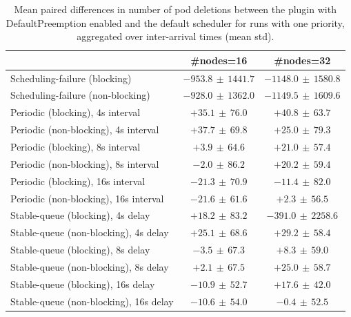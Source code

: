 \begin{table}[t]
\tiny
\setlength{\tabcolsep}{1.2pt}
\renewcommand{\arraystretch}{1.12}
\centering
\caption{Mean paired differences in number of pod deletions between the plugin with DefaultPreemption enabled and the default scheduler for runs with one priority, aggregated over inter-arrival times (mean \pm std).}
\label{tab:deletions-defpreempt1-prio1-std1-agg-arrival}
\begin{tabular}{l c c}
\toprule
 & \#nodes=16 & \#nodes=32 \\
\midrule
Scheduling-failure (blocking) & $-953.8\,\pm\,1441.7$ & $-1148.0\,\pm\,1580.8$ \\
Scheduling-failure (non-blocking) & $-928.0\,\pm\,1362.0$ & $-1149.5\,\pm\,1609.6$ \\
Periodic (blocking), 4s interval & $+35.1\,\pm\,76.0$ & $+40.8\,\pm\,63.7$ \\
Periodic (non-blocking), 4s interval & $+37.7\,\pm\,69.8$ & $+25.0\,\pm\,79.3$ \\
Periodic (blocking), 8s interval & $+3.9\,\pm\,64.6$ & $+21.0\,\pm\,57.4$ \\
Periodic (non-blocking), 8s interval & $-2.0\,\pm\,86.2$ & $+20.2\,\pm\,59.4$ \\
Periodic (blocking), 16s interval & $-21.3\,\pm\,70.9$ & $-11.4\,\pm\,82.0$ \\
Periodic (non-blocking), 16s interval & $-21.6\,\pm\,61.6$ & $+2.3\,\pm\,56.5$ \\
Stable-queue (blocking), 4s delay & $+18.2\,\pm\,83.2$ & $-391.0\,\pm\,2258.6$ \\
Stable-queue (non-blocking), 4s delay & $+25.1\,\pm\,68.6$ & $+29.2\,\pm\,58.4$ \\
Stable-queue (blocking), 8s delay & $-3.5\,\pm\,67.3$ & $+8.3\,\pm\,59.0$ \\
Stable-queue (non-blocking), 8s delay & $+2.1\,\pm\,67.5$ & $+25.0\,\pm\,58.7$ \\
Stable-queue (blocking), 16s delay & $-10.9\,\pm\,52.7$ & $+17.6\,\pm\,42.0$ \\
Stable-queue (non-blocking), 16s delay & $-10.6\,\pm\,54.0$ & $-0.4\,\pm\,52.5$ \\
\bottomrule
\end{tabular}
\end{table}

